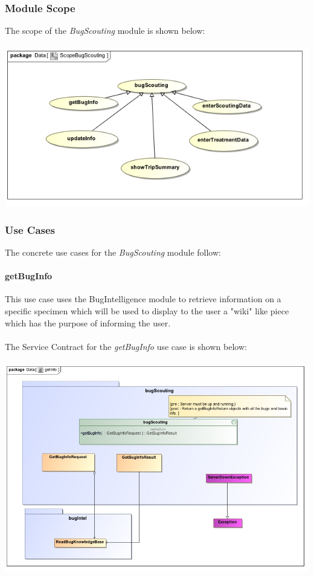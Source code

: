\documentclass[11pt,a4paper,titlepage]{article}
\begin{document}
		\subsubsection{Module Scope}
		The scope of the \textit{BugScouting} module is shown below:\\
		\hfill\\
		\includegraphics[width=\linewidth]{ScopeBugScouting}
		
		\subsubsection{Use Cases}
		The concrete use cases for the \textit{BugScouting} module follow:
		\paragraph{getBugInfo }
		This use case uses the BugIntelligence module to retrieve information on a specific specimen which will be used to display to the user a "wiki" like piece which has the purpose of informing the user.\\\hfill\\
		The Service Contract for the \textit{getBugInfo} use case is shown below:\\\hfill\\
		\includegraphics[width=\linewidth]{getInfo}
		
\end{document}
